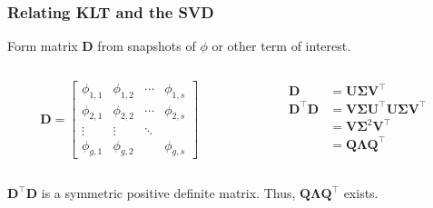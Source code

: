 \documentclass[fleqn]{beamer}
\begin{document}
  
  \begin{frame}
      \frametitle{Relating KLT and the SVD}
      \begin{block}{}
          Form matrix $\mathbf{D}$ from snapshots of $\phi$ or other term of 
          interest.
      \end{block}
      \begin{columns}[c]
          \begin{column}{0.5\textwidth}
              \begin{equation*}
              \mathbf{D} = \begin{bmatrix}
                  \phi_{1,1} & \phi_{1,2} & \cdots & \phi_{1,s} \\
                  \phi_{2,1} & \phi_{2,2} & \cdots & \phi_{2,s} \\
                  \vdots & \vdots & \ddots \\
                  \phi_{g,1} & \phi_{g,2} & & \phi_{g,s}
              \end{bmatrix}
          \end{equation*}
          \end{column}
          \begin{column}{0.5\textwidth}
              \begin{equation*}
                  \begin{split}
                      \mathbf{D} &= \mathbf{U} \bm{\Sigma} 
                      \mathbf{V}^{\intercal} \\
                      \mathbf{D}^{\intercal}\mathbf{D}  &= \mathbf{V} 
                      \bm{\Sigma} 
                      \mathbf{U}^{\intercal} \mathbf{U} \bm{\Sigma} 
                      \mathbf{V}^{\intercal} \\
                      &= \mathbf{V} \bm{\Sigma}^2 \mathbf{V}^{\intercal} \\
                      &= \mathbf{Q}\bm{\Lambda}\mathbf{Q}^{\intercal}
                  \end{split}
              \end{equation*}
          \end{column}
      \end{columns}
      \begin{block}{}
          $\mathbf{D}^{\intercal}\mathbf{D}$ is a symmetric positive definite 
          matrix.  Thus, $\mathbf{Q}\bm{\Lambda}\mathbf{Q}^{\intercal}$ exists.
      \end{block}
  \end{frame}
\end{document}
